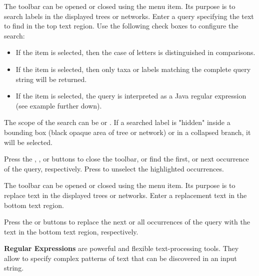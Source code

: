 \documentclass[11pt]{article}
\begin{document}

The  toolbar can be opened or closed using the
 menu item. Its purpose is to search  labels
in the displayed trees or networks. Enter a query specifying the text to find
 in the top text region.
Use the following check boxes to configure the search:
\begin{itemize}
\item If the  item is selected, then the case of
letters is distinguished in comparisons.
\item If the  item is selected, then only taxa or labels
matching the complete query string will be returned.
\item If the  item is selected,
the query is interpreted as a Java regular expression (see example further down).
\end{itemize}

The scope of the search can be  or .
If a searched label is "hidden" inside a bounding box (black opaque area of tree or network) or in a collapsed branch,
it will be selected.

Press the , ,   or 
buttons to close the toolbar, or find the first, or next occurrence
of the query, respectively. Press  to unselect the highlighted  occurrences.

The  toolbar can be opened or closed using the
  menu item. Its purpose is to replace  text
in the displayed trees or networks. Enter a replacement text in the bottom text region.

Press the  or   buttons to replace the next or all occurrences
of the query with the  text in the bottom text region, respectively. 


\textbf{Regular Expressions} are powerful and flexible text-processing tools.
They allow to specify complex patterns of text that can be discovered in an input string.
\end{document}
